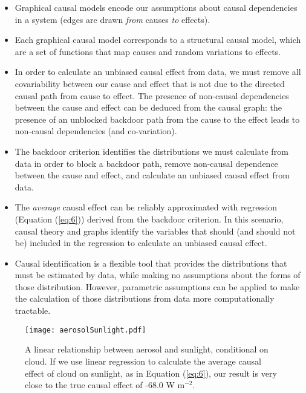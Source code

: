 \documentclass[12pt]{article}
\begin{document}
\begin{itemize}
\item Graphical causal models encode our assumptions about causal
  dependencies in a system (edges are drawn \emph{from} causes
  \emph{to} effects).
\item Each graphical causal model corresponds to a structural causal
  model, which are a set of functions that map causes and random
  variations to effects.
\item In order to calculate an unbiased causal effect from data, we
  must remove all covariability between our cause and effect that is
  not due to the directed causal path from cause to effect. The
  presence of non-causal dependencies between the cause and effect can
  be deduced from the causal graph: the presence of an unblocked
  backdoor path from the cause to the effect leads to non-causal
  dependencies (and co-variation).
\item The backdoor criterion identifies the distributions we must
  calculate from data in order to block a backdoor path, remove
  non-causal dependence between the cause and effect, and calculate an
  unbiased causal effect from data.
\item The \emph{average} causal effect can be reliably approximated
  with regression (Equation (\ref{eq:6})) derived from the backdoor
  criterion. In this scenario, causal theory and graphs identify the
  variables that should (and should not be) included in the regression
  to calculate an unbiased causal effect.
\item Causal identification is a flexible tool that provides the
  distributions that must be estimated by data, while making no
  assumptions about the forms of those distribution. However,
  parametric assumptions can be applied to make the calculation of
  those distributions from data more computationally tractable.
\end{itemize}

\begin{figure}
  \texttt{[image: aerosolSunlight.pdf]}
  \caption{A linear relationship between aerosol and sunlight,
    conditional on cloud. If we use linear regression to calculate the
    average causal effect of cloud on sunlight, as in Equation
    (\ref{eq:6}), our result is very close to the true causal effect
    of -68.0 W m$^{-2}$.}
  \label{fig:linear}
\end{figure}
\end{document}
